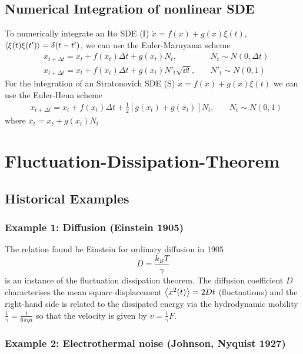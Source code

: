 \documentclass{/home/ben/Templates/notebook}
\begin{document}
	\section{Numerical Integration of nonlinear SDE}
	
	To numerically integrate an It$\bar{\mathrm{o}}$ SDE (I) $\dot{x} = f(x) + g(x) \xi(t)$, $\expval{\xi(t) \xi(t')} = \delta(t-t')$, we can use the Euler-Maruyama scheme
	\begin{eqnarray*}
		& x_{t + \Delta t} = x_t + f(x_t) \Delta t + g(x_t) N_t, \quad & N_t \sim N(0, \Delta t) \\
		& x_{t + \Delta t} = x_t + f(x_t) \Delta t + g(x_t) N'_t \sqrt{\dd{t}}, \quad & N'_t \sim N(0, 1)
	\end{eqnarray*}
	For the integration of an Stratonovich SDE (S) $\dot{x} = f(x) + g(x) \xi(t)$ we can use the Euler-Heun scheme
	\begin{eqnarray*}
		& x_{t + \Delta t} = x_t + f(x_t) \Delta t + \frac{1}{2} [g(x_t) + g(\bar{x}_t)] N_t, \quad & N_t \sim N(0,1) 
	\end{eqnarray*}
	where $\bar{x}_t = x_t + g(x_t) N_t$
	
	\chapter{Fluctuation-Dissipation-Theorem}
	
	\section{Historical Examples}
	
	\subsection*{Example 1: Diffusion (Einstein 1905)}
	
	The relation found be Einstein for ordinary diffusion in 1905
	\begin{equation}
	D = \frac{k_B T}{\gamma}
	\end{equation}
	is an instance of the fluctuation dissipation theorem. The diffusion coefficient $D$ characterises the mean square displacement $\expval{x^2(t)} = 2 D t$ (fluctuations) and the right-hand side is related to the dissipated energy via the hydrodynamic mobility $\frac{1}{\gamma} = \frac{1}{6 \pi \eta a}$ so that the velocity is given by $v = \frac{1}{\gamma} F$.
	
	\subsection*{Example 2: Electrothermal noise (Johnson, Nyquist 1927)}
	
\end{document}
